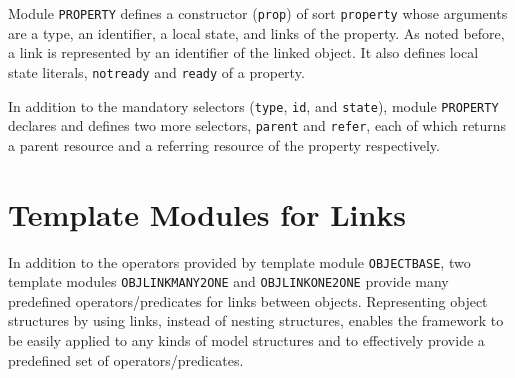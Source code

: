 \documentclass[12pt]{report}
\begin{document}
Module {\tt PROPERTY} defines a constructor ({\tt prop}) of sort
{\tt property} whose arguments are a type, an identifier, a local
state, and links of the property. As noted before, a link is
represented by an identifier of the linked object.  It also defines
local state literals, {\tt notready} and {\tt ready} of a property.

In addition to the mandatory selectors ({\tt type}, {\tt id}, and
{\tt state}), module {\tt PROPERTY} declares and defines two more
selectors, {\tt parent} and {\tt refer}, each of which returns a
parent resource and a referring resource of the property respectively.

\section{Template Modules for Links}
\label{sec:linkpred}
In addition to the operators provided by template module {\tt OBJECTBASE}, two
template modules {\tt OBJLINKMANY2ONE} and {\tt OBJLINKONE2ONE}
provide many predefined operators/predicates for links between
objects. Representing object structures by using links, instead of
nesting structures, enables the framework to be easily applied to any
kinds of model structures and to effectively provide a predefined set
of operators/predicates.
\end{document}
